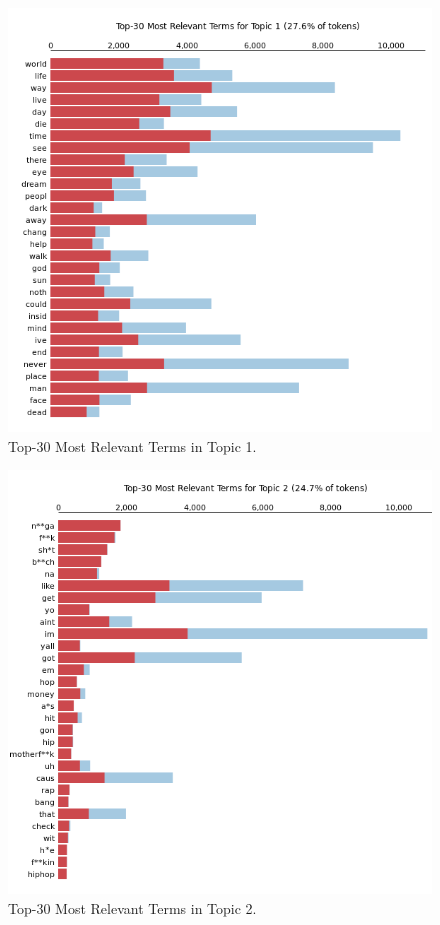 \begin{center}
\begin{figure}[H]
  \centering
  \includegraphics[width=6in]{img/topics/png/t1.png}
  \caption{Top-30 Most Relevant Terms in Topic 1.}
  \label{Figure:t1}
\end{figure}
\end{center}

\begin{center}
\begin{figure}[H]
  \centering
  \includegraphics[width=6in]{img/topics/png/t2_censored.png}
  \caption{Top-30 Most Relevant Terms in Topic 2.}
  \label{Figure:t2}
\end{figure}
\end{center}

